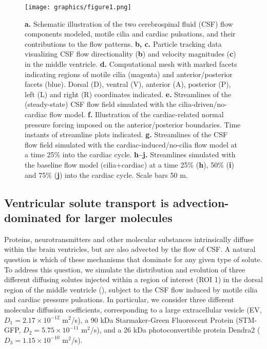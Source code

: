\documentclass{WileyMSP-template}
\begin{document}
\begin{figure}
    \centering
    \texttt{[image: graphics/figure1.png]}
    \caption{
    \textbf{a.} Schematic illustration of the two cerebrospinal fluid (CSF) flow components modeled,
    motile cilia and cardiac pulsations, and their contributions to the flow patterns.
    \textbf{b, c.} Particle tracking data visualizing CSF flow directionality (\textbf{b}) and
    velocity magnitudes (\textbf{c}) in the middle ventricle.
    \textbf{d.} Computational mesh with marked facets indicating regions of motile cilia (magenta) and
    anterior/posterior facets (blue). Dorsal (D), ventral (V), anterior (A), posterior (P),
    left (L) and right (R) coordinates indicated.
    \textbf{e.} Streamlines of the (steady-state) CSF flow field simulated with the
    cilia-driven/no-cardiac flow model.
    \textbf{f.} Illustration of the cardiac-related normal pressure forcing imposed on the
    anterior/posterior boundaries. Time instants of streamline plots indicated.
    \textbf{g.} Streamlines of the CSF flow field simulated with the cardiac-induced/no-cilia flow
    model at a time 25\% into the cardiac cycle. %
    \textbf{h--j.} Streamlines simulated with the baseline flow model (cilia+cardiac)
    at a time 25\% (\textbf{h}), 50\% (\textbf{i}) and 75\% (\textbf{j})
    into the cardiac cycle. %
    Scale bars 50 \textmu m.
    }
    \label{fig:fig1}
\end{figure}

\subsection{Ventricular solute transport is advection-dominated for larger molecules}

Proteins, neurotransmitters and other molecular substances
intrinsically diffuse within the brain ventricles, but are also
advected by the flow of CSF. A natural question is which of these
mechanisms that dominate for any given type of solute. To address this
question, we simulate the distribution and evolution of three
different diffusing solutes injected within a region of interest (ROI 1) in the
dorsal region of the middle ventricle (),
subject to the CSF flow induced by motile cilia and cardiac pressure
pulsations. In particular, we consider three different molecular
diffusion coefficients, corresponding to a large extracellular vesicle (EV, $D_1 = 2.17
\times 10^{-12}$ m$^2$/s), a 90 kDa Starmaker-Green Fluorescent Protein
(STM-GFP, $D_2 = 5.75 \times 10^{-11}$ m$^2$/s),
and a 26 kDa photoconvertible protein
Dendra2 ($D_3 = 1.15 \times 10^{-10}$ m$^2$/s).
\end{document}
